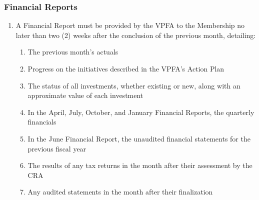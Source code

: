 \subsubsection{Financial Reports}
\label{financial-reports}

\begin{enumerate}
 \item
  A Financial Report must be provided by the VPFA to the Membership no later than two (2) weeks after the conclusion of the previous month, detailing:

  \begin{enumerate}
   \item
    The previous month's actuals
   \item
    Progress on the initiatives described in the VPFA's Action Plan
   \item
    The status of all investments, whether existing or new, along with an approximate value of each investment
   \item
    In the April, July, October, and January Financial Reports, the quarterly financials
   \item
    In the June Financial Report, the unaudited financial statements for the previous fiscal year
   \item
    The results of any tax returns in the month after their assessment by the CRA
   \item
    Any audited statements in the month after their finalization
  \end{enumerate}
\end{enumerate}

